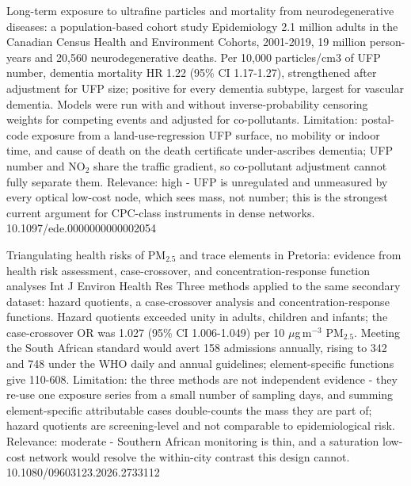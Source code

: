 \documentclass[10pt]{article}
\begin{document}
{Long-term exposure to ultrafine particles and mortality from neurodegenerative diseases: a population-based cohort study}
{Epidemiology}
{2.1 million adults in the Canadian Census Health and Environment Cohorts, 2001-2019, 19 million person-years and 20,560 neurodegenerative deaths. Per 10,000 particles/cm3 of UFP number, dementia mortality HR 1.22 (95\% CI 1.17-1.27), strengthened after adjustment for UFP size; positive for every dementia subtype, largest for vascular dementia. Models were run with and without inverse-probability censoring weights for competing events and adjusted for co-pollutants. Limitation: postal-code exposure from a land-use-regression UFP surface, no mobility or indoor time, and cause of death on the death certificate under-ascribes dementia; UFP number and NO$_2$ share the traffic gradient, so co-pollutant adjustment cannot fully separate them. Relevance: high - UFP is unregulated and unmeasured by every optical low-cost node, which sees mass, not number; this is the strongest current argument for CPC-class instruments in dense networks.}
{10.1097/ede.0000000000002054}

\par{}\baselineskip{}\baselineskip
{}

{Triangulating health risks of PM$_{2.5}$ and trace elements in Pretoria: evidence from health risk assessment, case-crossover, and concentration-response function analyses}
{Int J Environ Health Res}
{Three methods applied to the same secondary dataset: hazard quotients, a case-crossover analysis and concentration-response functions. Hazard quotients exceeded unity in adults, children and infants; the case-crossover OR was 1.027 (95\% CI 1.006-1.049) per 10 $\mu$g\,m$^{-3}$ PM$_{2.5}$. Meeting the South African standard would avert 158 admissions annually, rising to 342 and 748 under the WHO daily and annual guidelines; element-specific functions give 110-608. Limitation: the three methods are not independent evidence - they re-use one exposure series from a small number of sampling days, and summing element-specific attributable cases double-counts the mass they are part of; hazard quotients are screening-level and not comparable to epidemiological risk. Relevance: moderate - Southern African monitoring is thin, and a saturation low-cost network would resolve the within-city contrast this design cannot.}
{10.1080/09603123.2026.2733112}
\end{document}
